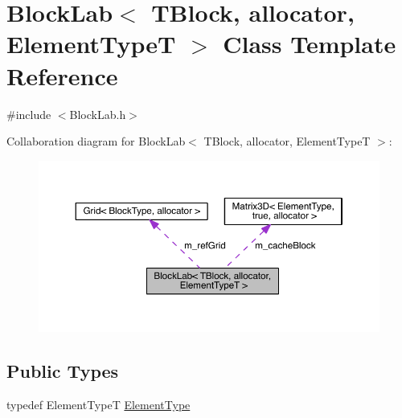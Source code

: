 \hypertarget{class_block_lab}{}\section{Block\+Lab$<$ T\+Block, allocator, Element\+Type\+T $>$ Class Template Reference}
\label{class_block_lab}


{\ttfamily \#include $<$Block\+Lab.\+h$>$}



Collaboration diagram for Block\+Lab$<$ T\+Block, allocator, Element\+Type\+T $>$\+:\nopagebreak
\begin{figure}[H]
\begin{center}
\leavevmode
\includegraphics[width=350pt]{da/daa/class_block_lab__coll__graph}
\end{center}
\end{figure}
\subsection*{Public Types}
\begin{DoxyCompactItemize}
\item 
typedef Element\+Type\+T \hyperlink{class_block_lab_accdcd2d5e815a8497e5ef9ae884da6b6}{Element\+Type}
\end{DoxyCompactItemize}
